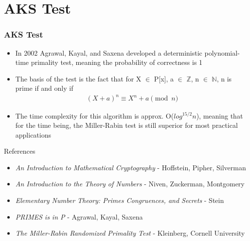 \documentclass{beamer}
\begin{document}
\section{AKS Test}

\begin{frame}
\frametitle{AKS Test}
\begin{itemize}
    \item In 2002 Agrawal, Kayal, and Saxena developed a deterministic polynomial-time primality test, meaning the probability of correctness is 1
    \item The basis of the test is the fact that for X $\in$ P[x], a $\in$ $\mathbb{Z}$, n $\in$ $\mathbb{N}$, n is prime if and only if 
    \begin{align*}
        (X + a)^n \equiv X^n + a \pmod n
    \end{align*}
    \item The time complexity for this algorithm is approx. O($log^{15/2}n$), meaning that for the time being, the Miller-Rabin test is still superior for most practical applications
\end{itemize}
\end{frame}

\begin{frame}{References}
    \begin{itemize}
        \item \textit{An Introduction to Mathematical Cryptography} - Hoffstein, Pipher, Silverman
        \item \textit{An Introduction to the Theory of Numbers} - Niven, Zuckerman, Montgomery
        \item \textit{Elementary Number Theory: Primes Congruences, and Secrets} - Stein
        \item \textit{PRIMES is in P} - Agrawal, Kayal, Saxena
        \item \textit{The Miller-Rabin Randomized Primality Test} - Kleinberg, Cornell University
    \end{itemize}
\end{frame}
    
\end{document}
